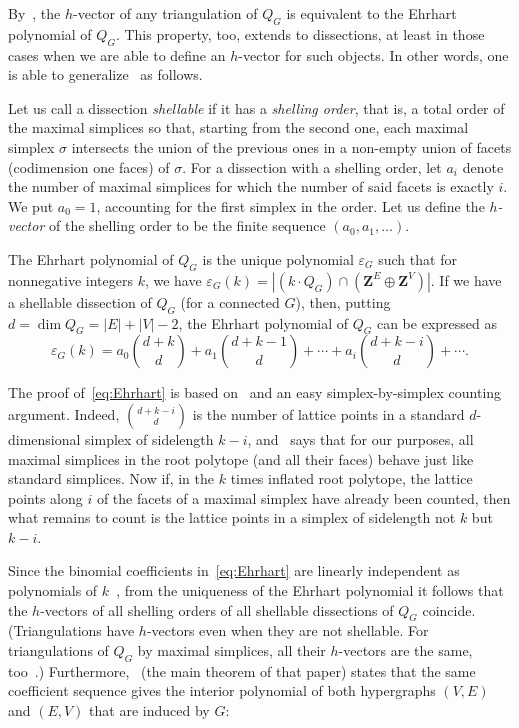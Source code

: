 \documentclass[ALCO,ThmDefs,Unicode,epreuves]{cedram}
\newcommand{\Z}{\mathbf{Z}}
\begin{document}
By~\cite[Theorem~3.10]{KP_Ehrhart}, the $h$-vector of any triangulation of $Q_G$ is equivalent to the Ehrhart polynomial of $Q_G$. This property, too, extends to dissections, at least in those cases when we are able to define an $h$-vector for such objects. In other words, one is able to generalize~\cite[Remark~3.12]{KP_Ehrhart} as follows.

Let us call a dissection \emph{shellable} if it has a \emph{shelling order}, that is, a total order of the maximal simplices so that, starting from the second one, each maximal simplex $\sigma$ intersects the union of the previous ones in a non-empty union of facets (codimension one faces) of $\sigma$. For a dissection with a shelling order, let $a_i$ denote the number of maximal simplices for which the number of said facets is exactly $i$. We put $a_0=1$, accounting for the first simplex in the order. Let us define the \emph{$h$-vector} of the shelling order to be the finite sequence $(a_0,a_1,\ldots)$.

The Ehrhart polynomial of $Q_G$ is the unique polynomial $\varepsilon_G$ such that for nonnegative integers $k$, we have $\varepsilon_{G}(k)=|(k\cdot Q_G)\cap(\Z^E\oplus\Z^V)|$. If we have a shellable dissection of $Q_G$ (for a connected $G$), then, putting $d=\dim Q_G=|E|+|V|-2$, the Ehrhart polynomial of $Q_G$ can be expressed as 
\begin{equation}
\label{eq:Ehrhart}
\varepsilon_{G}(k)=a_0\binom{d+k}{d}+a_1\binom{d+k-1}{d}+\cdots+a_i\binom{d+k-i}{d}+\cdots.
\end{equation}

The proof of~\eqref{eq:Ehrhart} is based on~\cite[Lemma~3.3]{KP_Ehrhart} and an easy simplex-by-simplex counting argument. Indeed, $\binom{d+k-i}{d}$ is the number of lattice points in a standard $d$-dimensional simplex of sidelength $k-i$, and~\cite[Lemma~3.3]{KP_Ehrhart} says that for our purposes, all maximal simplices in the root polytope (and all their faces) behave just like standard simplices. Now if, in the $k$ times inflated root polytope, the lattice points along $i$ of the facets of a maximal simplex have already been counted, then what remains to count is the lattice points in a simplex of sidelength not $k$ but $k-i$.

Since the binomial coefficients in~\eqref{eq:Ehrhart} are linearly independent as polynomials of $k$~\cite[Lemma~3.8]{KP_Ehrhart}, from the uniqueness of the Ehrhart polynomial it follows that the $h$-vectors of all shelling orders of all shellable dissections of $Q_G$ coincide. (Triangulations have $h$-vectors even when they are not shellable. For triangulations of $Q_G$ by maximal simplices, all their $h$-vectors are the same, too~\cite[Theorem~3.10]{KP_Ehrhart}.) Furthermore,~\cite[Equation~(5.1)]{KP_Ehrhart} (the main theorem of that paper) states that the same coefficient sequence gives the interior polynomial of both hypergraphs $(V,E)$ and $(E,V)$ that are induced by $G$:
\end{document}
